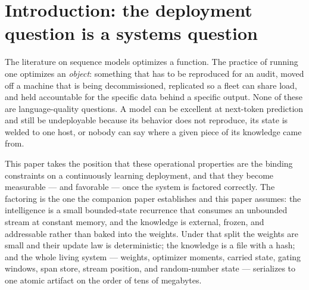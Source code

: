 \documentclass[11pt]{article}
\theoremstyle{definition}
\begin{document}
\begin{abstract}
``replay costs $2\times$'' is decomposed --- cache-replay compute is
$1.032\times$ live --- and replication resolves into exactly two regimes:
\emph{chase} replication is feasible iff the product of source rate and
follower cost is below one (measured divergent at $2.35$ on an unequal
pairing, standing debt growing \num{10000}$\to$\num{19000} chunks in one
cycle), while \emph{snapshot-sync} erases any deficit at transfer cost (a
$\sim$\num{6.5}-second transfer settled a \num{45000}-chunk deficit; a
follower separately replayed that entire life over the real network in
\num{458}~seconds).
\textbf{(iv) The cost structure is plannable.} The selection rate is a
deterministic function of (seed, width, recipe, stream), seed-robust at
$d{=}512$, and process memory stays inside \num{0.69}--\num{0.83}~GB across
\num{7053926400} streamed tokens in one continuous life. We close with
composition as a stabilizer (pointer to the companion) and state the measured
limits as the build paths they are: chase needs equal-or-faster hardware,
keyed recall through the file is open, and cross-replica arbitration is
unbuilt.
\end{abstract}

\section{Introduction: the deployment question is a systems question}
\label{sec:intro}

The literature on sequence models optimizes a function. The practice of
running one optimizes an \emph{object}: something that has to be reproduced
for an audit, moved off a machine that is being decommissioned, replicated so
a fleet can share load, and held accountable for the specific data behind a
specific output. None of these are language-quality questions. A model can be
excellent at next-token prediction and still be undeployable because its
behavior does not reproduce, its state is welded to one host, or nobody can
say where a given piece of its knowledge came from.

This paper takes the position that these operational properties are the
binding constraints on a continuously learning deployment, and that they
become measurable --- and favorable --- once the system is factored correctly.
The factoring is the one the companion paper establishes and this paper
assumes: the intelligence is a small bounded-state recurrence that consumes an
unbounded stream at constant memory, and the knowledge is external, frozen,
and addressable rather than baked into the weights. Under that split the
weights are small and their update law is deterministic; the knowledge is a
file with a hash; and the whole living system --- weights, optimizer moments,
carried state, gating windows, span store, stream position, and random-number
state --- serializes to one atomic artifact on the order of tens of megabytes.
\end{document}

